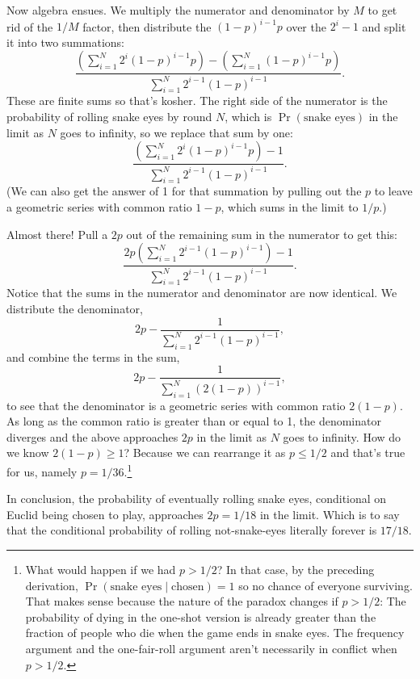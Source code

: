 \documentclass[article,twocolumn]{memoir}
\begin{document}
Now algebra ensues.
We multiply the numerator and denominator by $M$ to get rid of the $1/M$ factor, 
then distribute the $(1-p)^{i-1}p$ over the $2^i-1$ and split it into two summations:
$$\dfrac{
\left(\sum\limits_{i=1}^{N}2^i(1-p)^{i-1}p\right) -
\left(\sum\limits_{i=1}^{N}(1-p)^{i-1}p \right)
}{\sum\limits_{i=1}^{N} 2^{i-1}(1-p)^{i-1}}.
$$
These are finite sums so that's kosher.
The right side of the numerator is the probability of rolling snake eyes by round $N$, which is $\Pr(\text{snake eyes})$ in the limit as $N$ goes to infinity, so we replace that sum by one:
$$\dfrac{
\left(\sum\limits_{i=1}^{N}2^i(1-p)^{i-1}p\right) - 1
}{\sum\limits_{i=1}^{N}2^{i-1}(1-p)^{i-1}}.
$$
(We can also get the answer of 1 for that summation by pulling out the $p$ to leave a geometric series with common ratio $1-p$, which sums in the limit to $1/p$.)

Almost there!
Pull a $2p$ out of the remaining sum in the numerator to get this:
$$\dfrac{
2p\left(\sum\limits_{i=1}^{N}2^{i-1}(1-p)^{i-1}\right) - 1
}{\sum\limits_{i=1}^{N}2^{i-1}(1-p)^{i-1}}.
$$
Notice that the sums in the numerator and denominator are now identical.
We distribute the denominator,
$$2p - \dfrac{1} 
{\sum\limits_{i=1}^{N}2^{i-1}(1-p)^{i-1}},
$$
and combine the terms in the sum,
$$2p - \dfrac{1} 
{\sum\limits_{i=1}^{N}\left(2(1-p)\right)^{i-1}},
$$
to see that the denominator is a geometric series with common ratio $2(1-p)$.
As long as the common ratio is greater than or equal to 1, the denominator diverges and the above approaches $2p$ in the limit as $N$ goes to infinity.
How do we know $2(1-p) \geq 1$?
Because we can rearrange it as $p\leq 1/2$ and that's true for us, namely $p=1/36$.\footnote{
What would happen if we had $p>1/2$?
In that case, by the preceding derivation, $\Pr(\text{snake eyes}\mid\text{chosen}) = 1$ so no chance of everyone surviving.
That makes sense because the nature of the paradox changes if $p>1/2$:
The probability of dying in the one-shot version is already greater than the fraction of people who die when the game ends in snake eyes.
The frequency argument and the one-fair-roll argument aren't necessarily in conflict when $p>1/2$.}

In conclusion, the probability of eventually rolling snake eyes, conditional on Euclid being chosen to play, approaches $2p=1/18$ in the limit.
Which is to say that the conditional probability of rolling not-snake-eyes literally forever is $17/18$.
\end{document}
